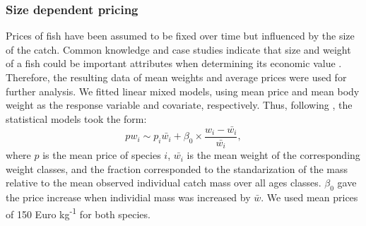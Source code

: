 \documentclass[12pt,oneline,a4paper,numbib]{ouparticle}
\numberwithin{equation}{subsection} %
\begin{document}
\subsubsection{Size dependent pricing}
\label{sec2.2.1}
Prices of fish have been assumed to be fixed over time but influenced by the size of the catch. Common knowledge and case studies indicate that size and weight of a fish could be important attributes when determining its economic value \cite{Zimmermann2011, Zimmermann2013}. Therefore, the resulting data of mean weights and average prices were used for further analysis. We fitted linear mixed models, using mean price and mean body weight as the response variable and covariate, respectively. Thus, following \cite{Zimmermann2011}, the statistical models took the form:  
\begin{equation}
 pw_{i} \sim p_i \bar{w_i} + \beta_0 \times \frac{w_i-\bar{w_i}}{\bar{w_i}},
\end{equation}
where $p$ is the mean price of species $i$, $\bar{w_i}$ is the mean weight of the corresponding weight classes, and the fraction corresponded to the standarization of the mass relative to the mean observed individual catch mass over all ages classes. $\beta_0$ gave the price increase when individial mass was increased by $\bar{w}$. We used mean prices of 150 Euro kg\textsuperscript{-1} for both species.
\end{document}
